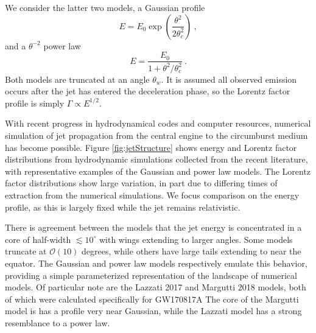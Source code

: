 \documentclass[twocolumn]{aastex62}
\newcommand{\gwbns}{GW170817A}
\begin{document}
We consider the latter two models, a Gaussian profile
\begin{equation}
	E = E_0 \exp\left( \frac{\theta^2 }{2 \theta_c^2}\right)\ , \label{eq:Gaussian}
\end{equation}
and a $\theta^{-2}$ power law
\begin{equation}
	E = \frac{E_0}{1 + \theta^2/\theta_c^2}\ . \label{eq:powerlaw}
\end{equation}
Both models are truncated at an angle $\theta_w$. It is assumed all observed emission occurs after the jet has entered the deceleration phase, so the Lorentz factor profile is simply $\Gamma \propto E^{1/2}$.

With recent progress in hydrodynamical codes and computer resources, numerical simulation of jet propagation from the central engine to the circumburst medium has become possible.  Figure \ref{fig:jetStructure} shows energy and Lorentz factor distributions from hydrodynamic simulations collected from the recent literature, with representative examples of the Gaussian and power law models. The Lorentz factor distributions show large variation, in part due to differing times of extraction from the numerical simulations.  We focus comparison on the energy profile, as this is largely fixed while the jet remains relativistic. 

\begin{figure}
\end{figure}

There is agreement between the models that the jet energy is concentrated in a core of half-width $\lesssim 10^\circ$ with wings extending to larger angles.  Some models truncate at $\mathcal{O}(10)$ degrees, while others have large tails extending to near the equator.  The Gaussian and power law models respectively emulate this behavior, providing a simple parameterized representation of the landscape of numerical models.  Of particular note are the Lazzati 2017 and Margutti 2018 models, both of which were calculated specifically for \gwbns{} The core of the Margutti model is has a profile very near Gaussian, while the Lazzati model has a strong resemblance to a power law.  



\end{document}
